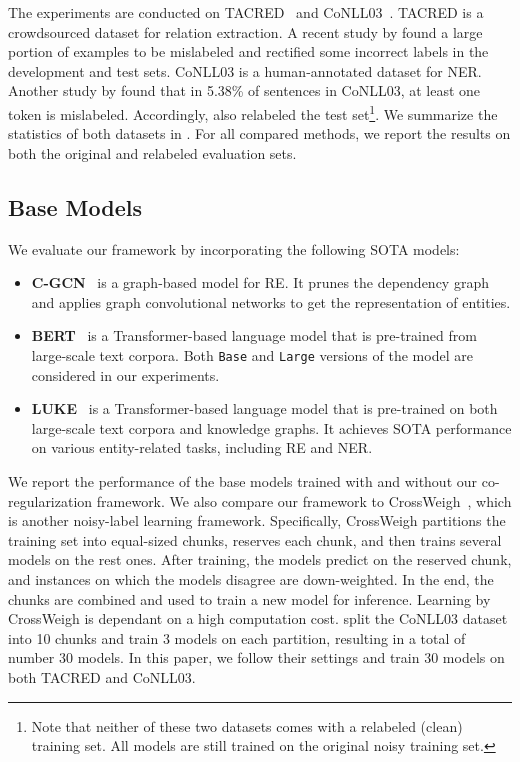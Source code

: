 \documentclass[11pt]{article}
\begin{document}
The experiments are conducted on TACRED~\cite{Zhang2017PositionawareAA} and CoNLL03~\cite{Sang2003IntroductionTT}. TACRED is a crowdsourced dataset for relation extraction.
A recent study by \citet{Alt2020TACREDRA} found a large portion of examples to be mislabeled and rectified some incorrect labels in the development and test sets. CoNLL03 is a human-annotated dataset for NER.
Another study by \citet{Wang2019CrossWeighTN} found that in 5.38\% of sentences in CoNLL03, at least one token is mislabeled. 
Accordingly, \citeauthor{Wang2019CrossWeighTN} also relabeled the test set\footnote{Note that neither of these two datasets comes with a relabeled (clean) training set. All models are still trained on the original noisy training set.}.
We summarize the statistics of both datasets in .
For all compared methods, we report the results on both the original and relabeled evaluation sets.




\subsection{Base Models}\label{sup:comp}
We evaluate our framework by incorporating the following SOTA models:
\begin{itemize}[leftmargin=1em]
    \setlength\itemsep{0em}
    \item \textbf{C-GCN}~\cite{Zhang2018GraphCO} is a graph-based model for RE.
    It prunes the dependency graph and applies graph convolutional networks to get the representation of entities.
    \item \textbf{BERT}~\cite{Devlin2019BERTPO} is a Transformer-based language model that is pre-trained from large-scale text corpora.
    Both \texttt{Base} and \texttt{Large} versions of the model are considered in our experiments.
    \item \textbf{LUKE}~\cite{Yamada2020LUKEDC} is a Transformer-based language model that is pre-trained on both large-scale text corpora and knowledge graphs.
    It achieves SOTA performance on various entity-related tasks, including RE and NER.
\end{itemize}
We report the performance of the base models trained with and without our co-regularization framework.
We also compare our framework to CrossWeigh~\cite{Wang2019CrossWeighTN}, which is another noisy-label learning framework.
Specifically, CrossWeigh partitions the training set into equal-sized chunks, reserves each chunk, and then trains several models on the rest ones.
After training, the models predict on the reserved chunk, and instances on which the models disagree are down-weighted.
In the end, the chunks are combined and used to train a new model for inference.
Learning by CrossWeigh is dependant on a high computation cost.
\citet{Wang2019CrossWeighTN} split the CoNLL03 dataset into 10 chunks and train 3 models on each partition, resulting in a total of number 30 models.
In this paper, we follow their settings and train 30 models on both TACRED and CoNLL03.
\end{document}
